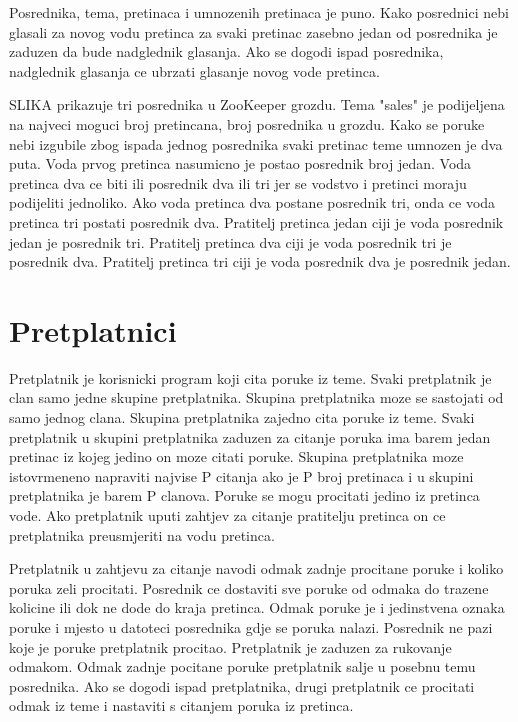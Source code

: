 \documentclass[times, utf8, diplomski, numeric]{fer}
\begin{document}
Posrednika, tema, pretinaca i umnozenih pretinaca je puno. Kako posrednici nebi glasali za novog vodu pretinca za svaki pretinac zasebno jedan od posrednika je zaduzen da bude nadglednik glasanja. Ako se dogodi ispad posrednika, nadglednik glasanja ce ubrzati glasanje novog vode pretinca.  

SLIKA prikazuje tri posrednika u ZooKeeper grozdu. Tema "sales" je podijeljena na najveci moguci broj pretincana, broj posrednika u grozdu. Kako se poruke nebi izgubile zbog ispada jednog posrednika svaki pretinac teme umnozen je dva puta. Voda prvog pretinca nasumicno je postao posrednik broj jedan. Voda pretinca dva ce biti ili posrednik dva ili tri jer se vodstvo i pretinci moraju podijeliti jednoliko. Ako voda pretinca dva postane posrednik tri, onda ce voda pretinca tri postati posrednik dva. Pratitelj pretinca jedan ciji je voda posrednik jedan je posrednik tri. Pratitelj pretinca dva ciji je voda posrednik tri je posrednik dva. Pratitelj pretinca tri ciji je voda posrednik dva je posrednik jedan.



\chapter{Pretplatnici}
Pretplatnik je korisnicki program koji cita poruke iz teme. Svaki pretplatnik je clan samo jedne skupine pretplatnika. Skupina pretplatnika moze se sastojati od samo jednog clana. Skupina pretplatnika zajedno cita poruke iz teme. Svaki pretplatnik u skupini pretplatnika zaduzen za citanje poruka ima barem jedan pretinac iz kojeg jedino on moze citati poruke. Skupina pretplatnika moze istovrmeneno napraviti najvise P citanja ako je P broj pretinaca i u skupini pretplatnika je barem P clanova. Poruke se mogu procitati jedino iz pretinca vode. Ako pretplatnik uputi zahtjev za citanje pratitelju pretinca on ce pretplatnika preusmjeriti na vodu pretinca.

Pretplatnik u zahtjevu za citanje navodi odmak zadnje procitane poruke i koliko poruka zeli procitati. Posrednik ce dostaviti sve poruke od odmaka do trazene kolicine ili dok ne dode do kraja pretinca. Odmak poruke je i jedinstvena oznaka poruke i mjesto u datoteci posrednika gdje se poruka nalazi. Posrednik ne pazi koje je poruke pretplatnik procitao. Pretplatnik je zaduzen za rukovanje odmakom. Odmak zadnje pocitane poruke pretplatnik salje u posebnu temu posrednika. Ako se dogodi ispad pretplatnika, drugi pretplatnik ce procitati odmak iz teme i nastaviti s citanjem poruka iz pretinca.
\end{document}
